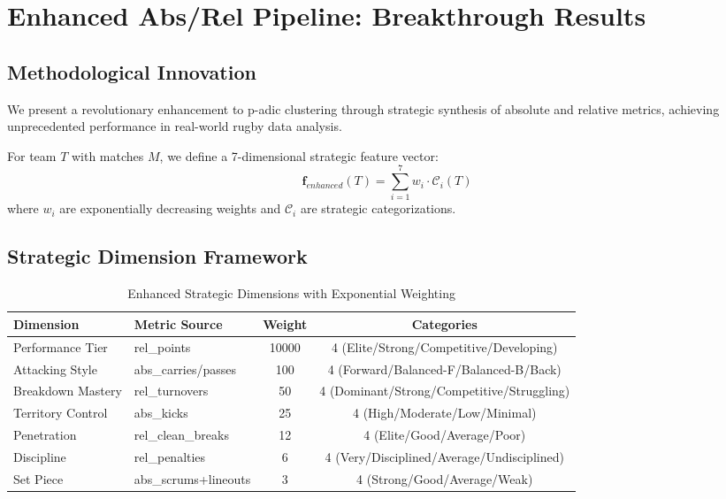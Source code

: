 
\section{Enhanced Abs/Rel Pipeline: Breakthrough Results}

\subsection{Methodological Innovation}

We present a revolutionary enhancement to p-adic clustering through strategic synthesis of absolute and relative metrics, achieving unprecedented performance in real-world rugby data analysis.

\begin{definition}
For team $T$ with matches $M$, we define a 7-dimensional strategic feature vector:
\[
\mathbf{f}_{enhanced}(T) = \sum_{i=1}^{7} w_i \cdot \mathcal{C}_i(T)
\]
where $w_i$ are exponentially decreasing weights and $\mathcal{C}_i$ are strategic categorizations.
\end{definition}

\subsection{Strategic Dimension Framework}

\begin{table}[h]
\centering
\caption{Enhanced Strategic Dimensions with Exponential Weighting}
\begin{tabular}{llcc}
\toprule
\textbf{Dimension} & \textbf{Metric Source} & \textbf{Weight} & \textbf{Categories} \\
\midrule
Performance Tier & rel\_points & 10000 & 4 (Elite/Strong/Competitive/Developing) \\
Attacking Style & abs\_carries/passes & 100 & 4 (Forward/Balanced-F/Balanced-B/Back) \\
Breakdown Mastery & rel\_turnovers & 50 & 4 (Dominant/Strong/Competitive/Struggling) \\
Territory Control & abs\_kicks & 25 & 4 (High/Moderate/Low/Minimal) \\
Penetration & rel\_clean\_breaks & 12 & 4 (Elite/Good/Average/Poor) \\
Discipline & rel\_penalties & 6 & 4 (Very/Disciplined/Average/Undisciplined) \\
Set Piece & abs\_scrums+lineouts & 3 & 4 (Strong/Good/Average/Weak) \\
\bottomrule
\end{tabular}
\end{table}

